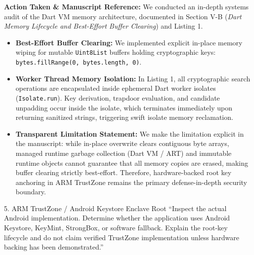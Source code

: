 \documentclass[11pt,a4paper]{article}
\begin{document}
\begin{responsebox}
\textbf{Action Taken \& Manuscript Reference:} We conducted an in-depth systems audit of the Dart VM memory architecture, documented in Section V-B (\emph{Dart Memory Lifecycle and Best-Effort Buffer Clearing}) and Listing 1.

\begin{itemize}[itemsep=2pt]
    \item \textbf{Best-Effort Buffer Clearing:} We implemented explicit in-place memory wiping for mutable \texttt{Uint8List} buffers holding cryptographic keys: \texttt{bytes.fillRange(0, bytes.length, 0)}.
    \item \textbf{Worker Thread Memory Isolation:} In Listing 1, all cryptographic search operations are encapsulated inside ephemeral Dart worker isolates (\texttt{Isolate.run}). Key derivation, trapdoor evaluation, and candidate unpadding occur inside the isolate, which terminates immediately upon returning sanitized strings, triggering swift isolate memory reclamation.
    \item \textbf{Transparent Limitation Statement:} We make the limitation explicit in the manuscript: while in-place overwrite clears contiguous byte arrays, managed runtime garbage collection (Dart VM / ART) and immutable runtime objects cannot guarantee that all memory copies are erased, making buffer clearing strictly best-effort. Therefore, hardware-backed root key anchoring in ARM TrustZone remains the primary defense-in-depth security boundary.
\end{itemize}
\end{responsebox}

\vspace{1em}

\begin{reviewbox}{5. ARM TrustZone / Android Keystore Enclave Root}
``Inspect the actual Android implementation. Determine whether the application uses Android Keystore, KeyMint, StrongBox, or software fallback. Explain the root-key lifecycle and do not claim verified TrustZone implementation unless hardware backing has been demonstrated.''
\end{reviewbox}
\end{document}
